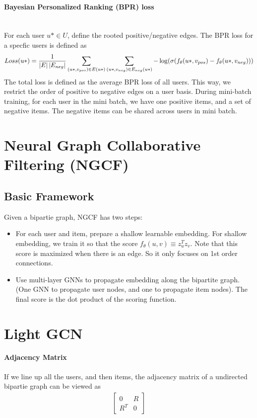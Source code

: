 \paragraph{Bayesian Personalized Ranking (BPR) loss} \mbox{}\\
For each user $u*\in U$, define the rooted positive/negative edges. The BPR loss for a specfic users is defined as 
    \begin{align*}
        Loss(u*) = \frac{1}{\left| E \right|\left| E_{neg} \right|} \sum_{(u*, v_{pos})\in E(u*)} \sum_{(u*, v_{neg})\in E_{neg}(u*)} -\log(\sigma(f_\theta(u*, v_{pos}) - f_\theta(u*, v_{neg})))
    \end{align*}
The total loss is defined as the average BPR loss of all users. This way, we restrict the order of positive to negative edges on a user basis. During mini-batch training, for each user in the mini batch, we have one positive items, and a set of negative items. The negative items can be shared across users in mini batch. 

\section{Neural Graph Collaborative Filtering (NGCF)}
\subsection{Basic Framework}
Given a bipartie graph, NGCF has two steps: 
    \begin{itemize}
        \item For each user and item, prepare a shallow learnable embedding. For shallow embedding, we train it so that the score $f_\theta(u,v) \equiv z_u^Tz_v$. Note that this score is maximized when there is an edge. So it only focuses on 1st order connections. 
        \item Use multi-layer GNNs to propagate embedding along the bipartite graph. (One GNN to propagate user nodes, and one to propagate item nodes). The final score is the dot product of the scoring function. 
    \end{itemize}

\section{Light GCN} 
\paragraph{Adjacency Matrix} If we line up all the users, and then items, the adjacency matrix of a undirected bipartie graph can be viewed as 
    \begin{align*}
        \begin{bmatrix}
            0 & R \\
            R^T & 0
        \end{bmatrix}
    \end{align*}

